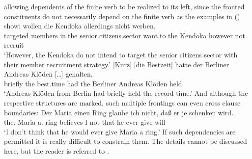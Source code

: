 allowing dependents of the finite verb to be realized to its left, since the fronted constituents do
not necessarily depend on the finite verb as the examples in () show:
\eal
\ex
\label{ex-mehrfach-vf-adv-acc}
\gll [Gezielt] [Mitglieder] [im     Seniorenbereich]       wollen  die Kendoka allerdings nicht werben.\footnotemark\\
    \spacebr{}targeted \spacebr{}members     \spacebr{}in.the senior.citizens.sector want.to the Kendoka however    not   recruit\\
\glt `However, the Kendoka do not intend to target the senior citizens sector with their member recruitment strategy.'%
\label{bsp-gezielt-mitglieder}
\ex 
\gll {}[Kurz] [die Bestzeit] hatte der Berliner Andreas Klöden [\ldots] gehalten.\footnotemark\\
	 \spacebr{}briefly \spacebr{}the best.time had the Berliner Andreas Klöden {} held\\
\label{bsp-kurz-die-bestzeit}     
\glt `Andreas Klöden from Berlin had briefly held the record time.'
\zl
And although the respective structures are marked, such multiple frontings can even cross clause boundaries:
\ea 
\gll Der Maria einen Ring glaube ich nicht, daß er je schenken wird.\footnotemark\\
	 the.\nom{} Maria a.\acc{} ring believes I not that he ever give will\\
\glt `I don't think that he would ever give Maria a ring.'
\z
If such dependencies are permitted it is really difficult to constrain them. The details cannot be
discussed here, but the reader is referred to \citep{Mueller2005d,MuellerGS}.

